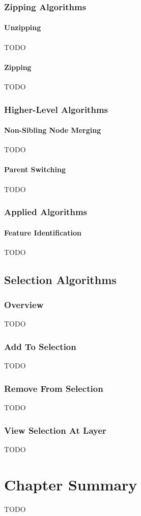\subsubsection{Zipping Algorithms}

\paragraph{Unzipping}

TODO

\paragraph{Zipping}

TODO

\subsubsection{Higher-Level Algorithms}

\paragraph{Non-Sibling Node Merging}

TODO

\paragraph{Parent Switching}

TODO

\subsubsection{Applied Algorithms}

\paragraph{Feature Identification}

TODO

\subsection{Selection Algorithms}

\subsubsection{Overview}

TODO

\subsubsection{Add To Selection}

TODO

\subsubsection{Remove From Selection}

TODO

\subsubsection{View Selection At Layer}

TODO

\section{Chapter Summary}

TODO
